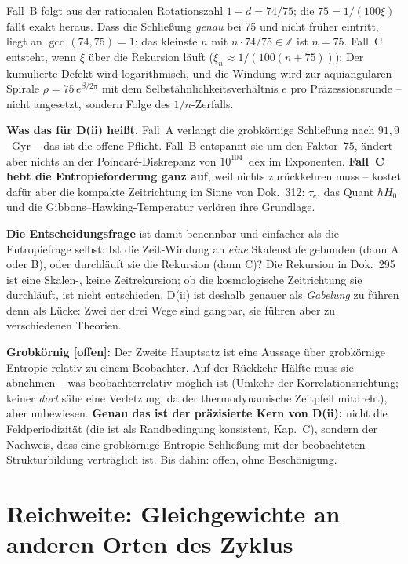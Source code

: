 \documentclass[11pt]{report}
\begin{document}
\noindent Fall~B folgt aus der rationalen Rotationszahl
$1-d = 74/75$; die $75 = 1/(100\xi)$ fällt exakt heraus. Dass die
Schließung \emph{genau} bei 75 und nicht früher eintritt, liegt an
$\gcd(74,75) = 1$: das kleinste $n$ mit $n\cdot 74/75 \in
\mathbb{Z}$ ist $n = 75$. Fall~C
entsteht, wenn $\xi$ über die Rekursion läuft
($\xi_n \approx 1/(100(n{+}75))$): Der kumulierte Defekt wird
logarithmisch, und die Windung wird zur äquiangularen Spirale
$\rho = 75\,e^{\beta/2\pi}$ mit dem Selbstähnlichkeitsverhältnis
$e$ pro Präzessionsrunde -- nicht angesetzt, sondern Folge des
$1/n$-Zerfalls.

\textbf{Was das für D(ii) heißt.} Fall~A verlangt die
grobkörnige Schließung nach $91{,}9$~Gyr -- das ist die offene
Pflicht. Fall~B entspannt sie um den Faktor~$75$, ändert aber
nichts an der Poincaré-Diskrepanz von $10^{104}$~dex im Exponenten.
\textbf{Fall~C hebt die Entropieforderung ganz auf}, weil nichts
zurückkehren muss -- kostet dafür aber die kompakte Zeitrichtung
im Sinne von Dok.~312: $\tau_c$, das Quant $\hbar H_0$ und die
Gibbons--Hawking-Temperatur verlören ihre Grundlage.

\textbf{Die Entscheidungsfrage} ist damit benennbar und
einfacher als die Entropiefrage selbst: Ist die Zeit-Windung an
\emph{eine} Skalenstufe gebunden (dann A oder B), oder durchläuft
sie die Rekursion (dann C)? Die Rekursion in Dok.~295 ist eine
Skalen-, keine Zeitrekursion; ob die kosmologische Zeitrichtung
sie durchläuft, ist nicht entschieden. D(ii) ist deshalb genauer
als \emph{Gabelung} zu führen denn als Lücke: Zwei der drei Wege
sind gangbar, sie führen aber zu verschiedenen Theorien.

\textbf{Grobkörnig [offen]:} Der Zweite Hauptsatz ist eine
Aussage über grobkörnige Entropie relativ zu einem Beobachter.
Auf der Rückkehr-Hälfte muss sie abnehmen -- was beobachterrelativ
möglich ist (Umkehr der Korrelationsrichtung; keiner
\emph{dort} sähe eine Verletzung, da der thermodynamische
Zeitpfeil mitdreht), aber unbewiesen. \textbf{Genau das ist der
präzisierte Kern von D(ii):} nicht die Feldperiodizität (die ist
als Randbedingung konsistent, Kap.~C), sondern der Nachweis, dass
eine grobkörnige Entropie-Schließung mit der beobachteten
Strukturbildung verträglich ist. Bis dahin: offen, ohne
Beschönigung.

\section{Reichweite: Gleichgewichte an anderen Orten des Zyklus}
\end{document}
